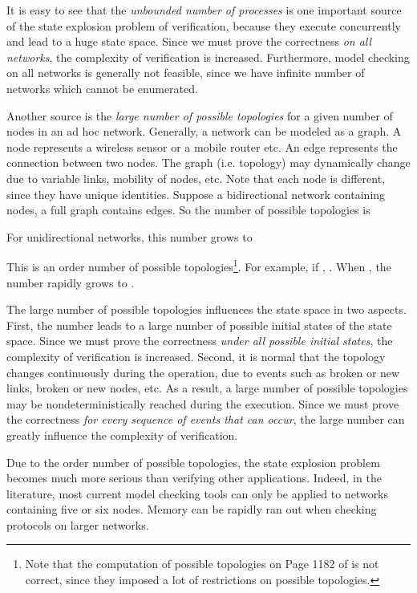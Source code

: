 \documentclass[a4paper,10pt,twocolumn]{article}
\begin{document}
It is easy to see that the \emph{unbounded number of processes} is one important source of the state explosion problem of verification, because they execute concurrently and lead to a huge state space. Since we must prove the correctness \emph{on all networks}, the complexity of verification is increased. Furthermore, model checking on all networks is generally not feasible, since we have infinite number of networks which cannot be enumerated.

Another source is the \emph{large number of possible topologies} for a given number of nodes in an ad hoc network. Generally, a network can be modeled as a graph. A node represents a wireless sensor or a mobile router etc. An edge represents the connection between two nodes. The graph (i.e. topology) may dynamically change due to variable links, mobility of nodes, etc. Note that each node is different, since they have unique identities. Suppose a bidirectional network containing  nodes, a full graph contains  edges. So the number of possible topologies is

For unidirectional networks, this number grows to

This is an  order number of possible topologies\footnote{Note that the computation of possible topologies on Page 1182 of \cite{RA04} is not correct, since they imposed a lot of restrictions on possible topologies.}. For example, if , . When , the number rapidly grows to .

The large number of possible topologies influences the state space in two aspects. First, the number leads to a large number of possible initial states of the state space. Since we must prove the correctness \emph{under all possible initial states}, the complexity of verification is increased. Second, it is normal that the topology changes continuously during the operation, due to events such as broken or new links, broken or new nodes, etc. As a result, a large number of possible topologies may be nondeterministically reached during the execution. Since we must prove the correctness \emph{for every sequence of events that can occur}, the large number can greatly influence the complexity of verification.

Due to the  order number of possible topologies, the state explosion problem becomes much more serious than verifying other applications. Indeed, in the literature, most current model checking tools can only be applied to networks containing five or six nodes. Memory can be rapidly ran out when checking protocols on larger networks.
\end{document}
